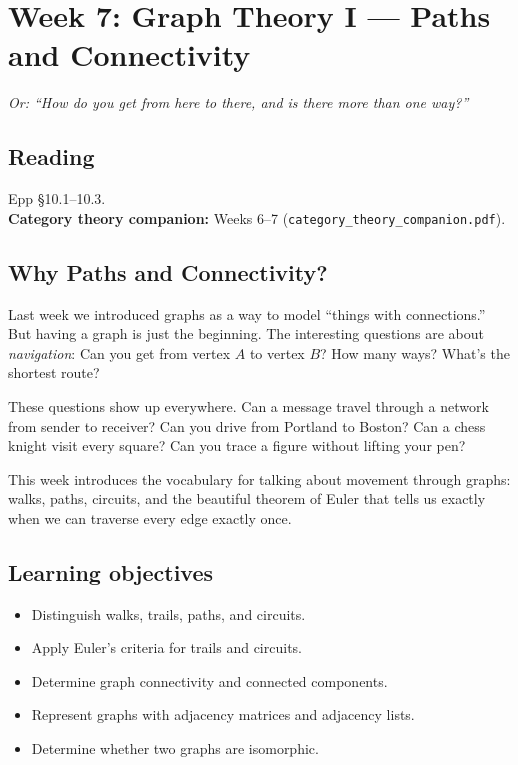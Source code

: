 \section{Week 7: Graph Theory I --- Paths and Connectivity}

\textit{Or: ``How do you get from here to there, and is there more than one way?''}

\subsection*{Reading}
Epp \S 10.1--10.3.\\
\textbf{Category theory companion:} Weeks 6--7 (\texttt{category\_theory\_companion.pdf}).

\subsection*{Why Paths and Connectivity?}

Last week we introduced graphs as a way to model ``things with connections.'' But having a graph is just the beginning. The interesting questions are about \emph{navigation}: Can you get from vertex $A$ to vertex $B$? How many ways? What's the shortest route?

These questions show up everywhere. Can a message travel through a network from sender to receiver? Can you drive from Portland to Boston? Can a chess knight visit every square? Can you trace a figure without lifting your pen?

This week introduces the vocabulary for talking about movement through graphs: walks, paths, circuits, and the beautiful theorem of Euler that tells us exactly when we can traverse every edge exactly once.

\subsection*{Learning objectives}
\begin{itemize}
  \item Distinguish walks, trails, paths, and circuits.
  \item Apply Euler's criteria for trails and circuits.
  \item Determine graph connectivity and connected components.
  \item Represent graphs with adjacency matrices and adjacency lists.
  \item Determine whether two graphs are isomorphic.
\end{itemize}

